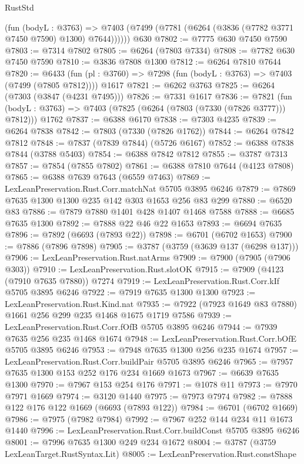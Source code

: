 \begin{lexlean}{RustStd}
\begin{coremodule}
        (fun (bodyL : @3763) =>
        @7403 (@7499 (@7781 (@6264 (@3836 (@7782 @3771 @7450 @7590) @1300) @7644))))))
    @630
@7802 := @7775 @630 @7450 @7590
@7803 := @7314 @7802
@7805 := @6264 (@7803 @7334)
@7808 := @7782 @630 @7450 @7590
@7810 := @3836 @7808 @1300
@7812 := @6264 @7810 @7644
@7820 := @6433
    (fun (pl : @3760) => @7298 (fun (bodyL : @3763) => @7403 (@7499 (@7805 @7812))))
    @1617
@7821 := @6262 @3763
@7825 := @6264 (@7303 (@3847 (@4231 @7495)))
@7826 := @7331 @1617
@7836 := @7821
    (fun (bodyL : @3763) => @7403 (@7825 (@6264 (@7803 (@7330 (@7826 @3777))) @7812)))
    @1762
@7837 := @6388 @6170
@7838 := @7303 @4235
@7839 := @6264 @7838
@7842 := @7803 (@7330 (@7826 @1762))
@7844 := @6264 @7842 @7812
@7848 := @7837 (@7839 @7844) (@5726 @6167)
@7852 := @6388 @7838 @7844 (@3788 @5403)
@7854 := @6388 @7842 @7812
@7855 := @3787 @7313
@7857 := @7854 (@7855 @7802)
@7861 := @6388 @7810 @7644 (@4123 @7808)
@7865 := @6388 @7639 @7643 (@6559 @7463)
@7869 := LexLeanPreservation.Rust.Corr.matchNat @5705 @3895 @6246
@7879 := @7869 @7635 @1300 @1300 @235 @142 @303 @1653 @256 @83 @299
@7880 := @6520 @83
@7886 := @7879 @7880 @1401 @428 @1407 @1468 @7588
@7888 := @6685 @7635 @1300
@7892 := @7888 @22 @46 @22 @1653
@7893 := @6694 @7635
@7896 := @7892 (@6693 (@7893 @22))
@7898 := @6701 (@6702 @1653)
@7900 := @7886 (@7896 @7898)
@7905 := @3787 (@3759 (@3639 @137 (@6298 @137)))
@7906 := LexLeanPreservation.Rust.natArms
@7909 := @7900 (@7905 (@7906 @303))
@7910 := LexLeanPreservation.Rust.slotOK
@7915 := @7909 (@4123 (@7910 @7635 @7880)) @7274
@7919 := LexLeanPreservation.Rust.Corr.kIf @5705 @3895 @6246
@7922 := @7919 @7635 @1300 @1300
@7923 := LexLeanPreservation.Rust.Kind.nat
@7935 := @7922 (@7923 @1649 @83 @7880) @1661 @256 @299 @235 @1468 @1675 @1719 @7586
@7939 := LexLeanPreservation.Rust.Corr.fOfB @5705 @3895 @6246
@7944 := @7939 @7635 @256 @235 @1468 @1674
@7948 := LexLeanPreservation.Rust.Corr.bOfE @5705 @3895 @6246
@7953 := @7948 @7635 @1300 @256 @235 @1674
@7957 := LexLeanPreservation.Rust.Corr.buildPair @5705 @3895 @6246
@7965 := @7957 @7635 @1300 @153 @252 @176 @234 @1669 @1673
@7967 := @6639 @7635 @1300
@7970 := @7967 @153 @254 @176
@7971 := @1078 @11
@7973 := @7970 @7971 @1669
@7974 := @3120 @1440
@7975 := @7973 @7974
@7982 := @7888 @122 @176 @122 @1669 (@6693 (@7893 @122))
@7984 := @6701 (@6702 @1669)
@7986 := @7975 (@7982 @7984)
@7992 := @7967 @252 @144 @234 @11 @1673 @1440
@7996 := LexLeanPreservation.Rust.Corr.buildConst @5705 @3895 @6246
@8001 := @7996 @7635 @1300 @249 @234 @1672
@8004 := @3787 (@3759 LexLeanTarget.RustSyntax.Lit)
@8005 := LexLeanPreservation.Rust.constShape

\end{coremodule}
\end{lexlean}
